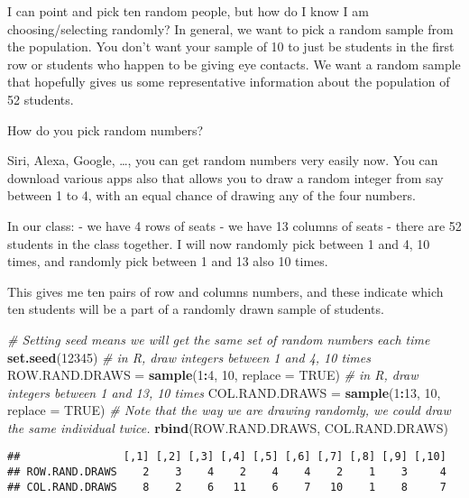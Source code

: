 \documentclass[
]{book}
\newenvironment{Shaded}{\begin{snugshade}}{\end{snugshade}}
\newcommand{\CommentTok}[1]{\textcolor[rgb]{0.56,0.35,0.01}{\textit{#1}}}
\newcommand{\DataTypeTok}[1]{\textcolor[rgb]{0.13,0.29,0.53}{#1}}
\newcommand{\DecValTok}[1]{\textcolor[rgb]{0.00,0.00,0.81}{#1}}
\newcommand{\KeywordTok}[1]{\textcolor[rgb]{0.13,0.29,0.53}{\textbf{#1}}}
\newcommand{\NormalTok}[1]{#1}
\newcommand{\OperatorTok}[1]{\textcolor[rgb]{0.81,0.36,0.00}{\textbf{#1}}}
\newcommand{\OtherTok}[1]{\textcolor[rgb]{0.56,0.35,0.01}{#1}}
\newcommand{\StringTok}[1]{\textcolor[rgb]{0.31,0.60,0.02}{#1}}
\begin{document}
I can point and pick ten random people, but how do I know I am choosing/selecting randomly? In general, we want to pick a random sample from the population. You don't want your sample of 10 to just be students in the first row or students who happen to be giving eye contacts. We want a random sample that hopefully gives us some representative information about the population of 52 students.

How do you pick random numbers?

Siri, Alexa, Google, \ldots, you can get random numbers very easily now. You can download various apps also that allows you to draw a random integer from say between 1 to 4, with an equal chance of drawing any of the four numbers.

In our class:
- we have 4 rows of seats
- we have 13 columns of seats
- there are 52 students in the class together. I will now randomly pick between 1 and 4, 10 times, and randomly pick between 1 and 13 also 10 times.

This gives me ten pairs of row and columns numbers, and these indicate which ten students will be a part of a randomly drawn sample of students.

\begin{Shaded}
\begin{Highlighting}[]
\CommentTok{\# Setting seed means we will get the same set of random numbers each time}
\KeywordTok{set.seed}\NormalTok{(}\DecValTok{12345}\NormalTok{)}
\CommentTok{\# in R, draw integers between 1 and 4, 10 times}
\NormalTok{ROW.RAND.DRAWS =}\StringTok{ }\KeywordTok{sample}\NormalTok{(}\DecValTok{1}\OperatorTok{:}\DecValTok{4}\NormalTok{, }\DecValTok{10}\NormalTok{, }\DataTypeTok{replace =} \OtherTok{TRUE}\NormalTok{)}
\CommentTok{\# in R, draw integers between 1 and 13, 10 times}
\NormalTok{COL.RAND.DRAWS =}\StringTok{ }\KeywordTok{sample}\NormalTok{(}\DecValTok{1}\OperatorTok{:}\DecValTok{13}\NormalTok{, }\DecValTok{10}\NormalTok{, }\DataTypeTok{replace =} \OtherTok{TRUE}\NormalTok{)}
\CommentTok{\# Note that the way we are drawing randomly, we could draw the same individual twice.}
\KeywordTok{rbind}\NormalTok{(ROW.RAND.DRAWS, COL.RAND.DRAWS)}
\end{Highlighting}
\end{Shaded}

\begin{verbatim}
##                [,1] [,2] [,3] [,4] [,5] [,6] [,7] [,8] [,9] [,10]
## ROW.RAND.DRAWS    2    3    4    2    4    4    2    1    3     4
## COL.RAND.DRAWS    8    2    6   11    6    7   10    1    8     7
\end{verbatim}
\end{document}
